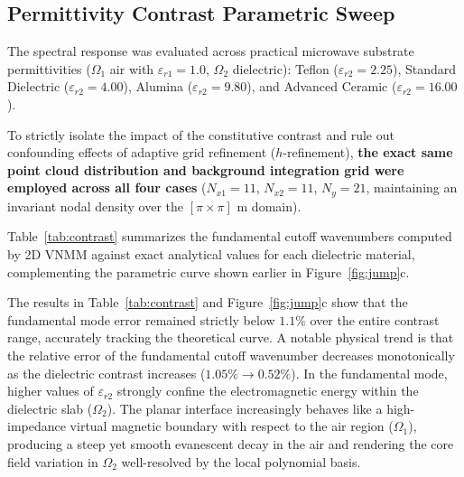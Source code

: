 \documentclass[11pt,a4paper]{article}
\begin{document}
\subsection{Permittivity Contrast Parametric Sweep}
The spectral response was evaluated across practical microwave substrate permittivities ($\Omega_1$ air with $\varepsilon_{r1} = 1.0$, $\Omega_2$ dielectric): Teflon ($\varepsilon_{r2} = 2.25$), Standard Dielectric ($\varepsilon_{r2} = 4.00$), Alumina ($\varepsilon_{r2} = 9.80$), and Advanced Ceramic ($\varepsilon_{r2} = 16.00$).

To strictly isolate the impact of the constitutive contrast and rule out confounding effects of adaptive grid refinement ($h$-refinement), \textbf{the exact same point cloud distribution and background integration grid were employed across all four cases} ($N_{x1}=11$, $N_{x2}=11$, $N_y=21$, maintaining an invariant nodal density over the $[\pi \times \pi]\text{ m}$ domain).

Table~\ref{tab:contrast} summarizes the fundamental cutoff wavenumbers computed by 2D VNMM against exact analytical values for each dielectric material, complementing the parametric curve shown earlier in Figure~\ref{fig:jump}c.

\begin{table}[H]
\centering
\caption{Accuracy of the fundamental cutoff wavenumber across different dielectric contrast levels with a fixed point cloud.}
\label{tab:contrast}
\end{table}

The results in Table~\ref{tab:contrast} and Figure~\ref{fig:jump}c show that the fundamental mode error remained strictly below $1.1\%$ over the entire contrast range, accurately tracking the theoretical curve. A notable physical trend is that the relative error of the fundamental cutoff wavenumber decreases monotonically as the dielectric contrast increases ($1.05\% \to 0.52\%$). In the fundamental mode, higher values of $\varepsilon_{r2}$ strongly confine the electromagnetic energy within the dielectric slab ($\Omega_2$). The planar interface increasingly behaves like a high-impedance virtual magnetic boundary with respect to the air region ($\Omega_1$), producing a steep yet smooth evanescent decay in the air and rendering the core field variation in $\Omega_2$ well-resolved by the local polynomial basis.
\end{document}
